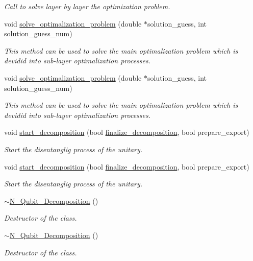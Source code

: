 \begin{DoxyCompactItemize}
\begin{DoxyCompactList}\small\item\em Call to solve layer by layer the optimization problem. \end{DoxyCompactList}\item 
void \hyperlink{class_decomposition___base_ae21ecd8c5016a6ec942330247e8cdebc}{solve\+\_\+optimalization\+\_\+problem} (double $\ast$solution\+\_\+guess, int solution\+\_\+guess\+\_\+num)
\begin{DoxyCompactList}\small\item\em This method can be used to solve the main optimalization problem which is devidid into sub-\/layer optimalization processes. \end{DoxyCompactList}\item 
void \hyperlink{class_decomposition___base_ae21ecd8c5016a6ec942330247e8cdebc}{solve\+\_\+optimalization\+\_\+problem} (double $\ast$solution\+\_\+guess, int solution\+\_\+guess\+\_\+num)
\begin{DoxyCompactList}\small\item\em This method can be used to solve the main optimalization problem which is devidid into sub-\/layer optimalization processes. \end{DoxyCompactList}\item 
void \hyperlink{class_n___qubit___decomposition_ae7fd1992d645a7ff41c02e48ba1dc5ad}{start\+\_\+decomposition} (bool \hyperlink{class_decomposition___base_a0cdd12741e72e2c074a188fe3867e6d5}{finalize\+\_\+decomposition}, bool prepare\+\_\+export)
\begin{DoxyCompactList}\small\item\em Start the disentanglig process of the unitary. \end{DoxyCompactList}\item 
void \hyperlink{class_n___qubit___decomposition_ae7fd1992d645a7ff41c02e48ba1dc5ad}{start\+\_\+decomposition} (bool \hyperlink{class_decomposition___base_a0cdd12741e72e2c074a188fe3867e6d5}{finalize\+\_\+decomposition}, bool prepare\+\_\+export)
\begin{DoxyCompactList}\small\item\em Start the disentanglig process of the unitary. \end{DoxyCompactList}\item 
\hyperlink{class_n___qubit___decomposition_a004ce968593854e1a32f61039105d6eb}{$\sim$\+N\+\_\+\+Qubit\+\_\+\+Decomposition} ()
\begin{DoxyCompactList}\small\item\em Destructor of the class. \end{DoxyCompactList}\item 
\hyperlink{class_n___qubit___decomposition_a004ce968593854e1a32f61039105d6eb}{$\sim$\+N\+\_\+\+Qubit\+\_\+\+Decomposition} ()
\begin{DoxyCompactList}\small\item\em Destructor of the class. \end{DoxyCompactList}\end{DoxyCompactItemize}
